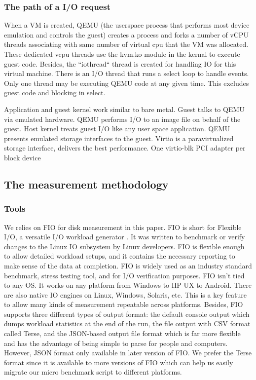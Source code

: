 \documentclass{acmsig}
\begin{document}
  \subsubsection{The path of a I/O request}
  
  When a VM is created, QEMU (the userspace process that performs most device emulation and controls the guest) creates a process and forks a number of vCPU threads associating with same number of virtual cpu that the VM was allocated. These dedicated vcpu threads use the kvm.ko module in the kernal to execute guest code. Besides, the ``iothread`` thread is created for handling IO for this virtual machine. There is an I/O thread that runs a select loop to handle events. Only one thread may be executing QEMU code at any given time. This excludes guest code and blocking in select.

  Application and guest kernel work similar to bare metal. Guest talks to QEMU via emulated hardware. QEMU performs I/O to an image file on behalf of the guest. Host kernel treats guest I/O like any user space application. QEMU presents emulated storage interfaces to the guest. Virtio is a paravirtualized storage interface, delivers the best performance. One virtio-blk PCI adapter per block device


\subsection{The measurement methodology}

\subsubsection{Tools}

We relies on FIO for disk measurement in this paper. FIO is short for Flexible I/O, a versatile I/O workload generator \cite{fio}. It was written to benchmark or verify changes to the Linux IO subsystem by Linux developers. FIO is flexible enough to allow detailed workload setups, and it contains the necessary reporting to make sense of the data at completion. FIO is widely used as an industry standard benchmark, stress testing tool, and for I/O verification purposes. FIO isn't tied to any OS. It works on any platform from Windows to HP-UX to Android. There are also native IO engines on Linux, Windows, Solaris, etc. This is a key feature to allow many kinds of measurement repeatable across platforms. Besides, FIO supports three different types of output format: the default console output which dumps workload statistics at the end of the run, the file output with CSV format called Terse, and the JSON-based output file format which is far more flexible and has the advantage of being simple to parse for people and computers. However, JSON format only available in later version of FIO. We prefer the Terse format since it is available to more versions of FIO which can help us easily migrate our micro benchmark script to different platforms.
\end{document}
